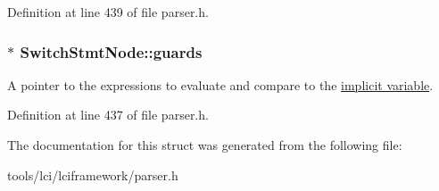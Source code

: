 Definition at line 439 of file parser.\-h.

\hypertarget{struct_switch_stmt_node_a125319a6fd02d72d96d41193daffb4a2}{
\subsubsection[{guards}]{$\ast$ {\bf Switch\-Stmt\-Node\-::guards}}}\label{struct_switch_stmt_node_a125319a6fd02d72d96d41193daffb4a2}
A pointer to the expressions to evaluate and compare to the \hyperlink{impvar}{implicit variable}. 

Definition at line 437 of file parser.\-h.



The documentation for this struct was generated from the following file\-:\begin{DoxyCompactItemize}
\item 
tools/lci/lciframework/parser.\-h\end{DoxyCompactItemize}
